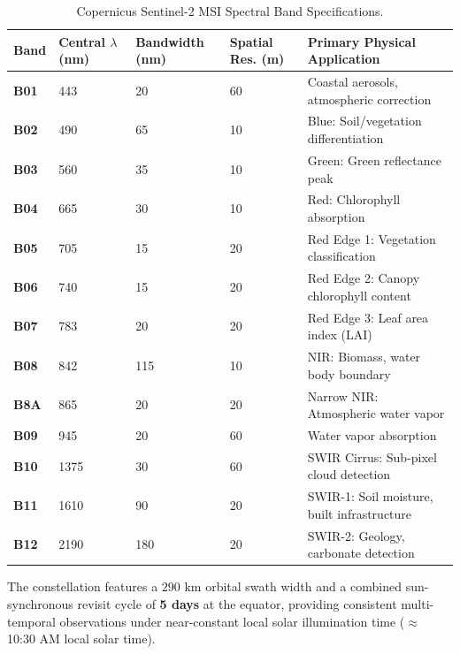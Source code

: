 \begin{table}[htbp]
\centering
\caption{Copernicus Sentinel-2 MSI Spectral Band Specifications.}
\label{tab:sentinel2_bands}
\begin{tabularx}{\textwidth}{@{}lllXl@{}}
\toprule
\textbf{Band} & \textbf{Central $\lambda$ (nm)} & \textbf{Bandwidth (nm)} & \textbf{Spatial Res. (m)} & \textbf{Primary Physical Application} \\
\midrule
\textbf{B01} & 443 & 20 & 60 & Coastal aerosols, atmospheric correction \\
\textbf{B02} & 490 & 65 & 10 & Blue: Soil/vegetation differentiation \\
\textbf{B03} & 560 & 35 & 10 & Green: Green reflectance peak \\
\textbf{B04} & 665 & 30 & 10 & Red: Chlorophyll absorption \\
\textbf{B05} & 705 & 15 & 20 & Red Edge 1: Vegetation classification \\
\textbf{B06} & 740 & 15 & 20 & Red Edge 2: Canopy chlorophyll content \\
\textbf{B07} & 783 & 20 & 20 & Red Edge 3: Leaf area index (LAI) \\
\textbf{B08} & 842 & 115 & 10 & NIR: Biomass, water body boundary \\
\textbf{B8A} & 865 & 20 & 20 & Narrow NIR: Atmospheric water vapor \\
\textbf{B09} & 945 & 20 & 60 & Water vapor absorption \\
\textbf{B10} & 1375 & 30 & 60 & SWIR Cirrus: Sub-pixel cloud detection \\
\textbf{B11} & 1610 & 90 & 20 & SWIR-1: Soil moisture, built infrastructure \\
\textbf{B12} & 2190 & 180 & 20 & SWIR-2: Geology, carbonate detection \\
\bottomrule
\end{tabularx}
\end{table}

The constellation features a $290\text{ km}$ orbital swath width and a combined sun-synchronous revisit cycle of \textbf{5 days} at the equator, providing consistent multi-temporal observations under near-constant local solar illumination time ($\approx$ 10:30 AM local solar time).

